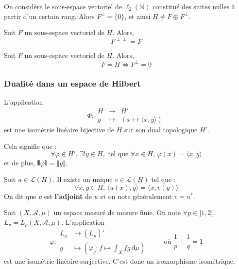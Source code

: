   \begin{cexample}
    On considère le sous-espace vectoriel de $\ell_2(\mathbb{N})$ constitué des suites nulles à partir d'un certain rang. Alors $F^\perp = \{ 0 \}$, et ainsi $H \neq F \oplus F^\perp$.
  \end{cexample}

  \begin{corollary}
    Soit $F$ un sous-espace vectoriel de $H$. Alors,
    \[ F^{\perp \perp} = \overline{F} \]
  \end{corollary}

  \begin{corollary}
    Soit $F$ un sous-espace vectoriel de $H$. Alors,
    \[ \overline{F} = H \iff F^\perp = 0 \]
  \end{corollary}

  \subsubsection{Dualité dans un espace de Hilbert}

  \begin{theorem}
    L'application
    \[
    \Phi :
    \begin{array}{ccc}
      H &\rightarrow& H' \\
      y &\mapsto& (x \mapsto \langle x, y \rangle)
    \end{array}
    \]
    est une isométrie linéaire bijective de $H$ sur son dual topologique $H'$.
  \end{theorem}

  \begin{remark}
    Cela signifie que :
    \[ \forall \varphi \in H', \, \exists! y \in H, \text{ tel que } \forall x \in H, \, \varphi(x) = \langle x, y \rangle \]
    et de plus, $\VERT \varphi \VERT = \Vert y \Vert$.
  \end{remark}

  \begin{application}
    Soit $u \in \mathcal{L}(H)$. Il existe un unique $v \in \mathcal{L}(H)$ tel que :
    \[ \forall x, y \in H, \, \langle u(x), y \rangle = \langle x, v(y) \rangle \]
    On dit que $v$ est \textbf{l'adjoint} de $u$ et on note généralement $v = u^*$.
  \end{application}


  \begin{application}[Dual de $L_p$]
    Soit $(X, \mathcal{A}, \mu)$ un espace mesuré de mesure finie. On note $\forall p \in ]1,2[$, $L_p = L_p(X, \mathcal{A}, \mu)$. L'application
    \[
    \varphi :
    \begin{array}{ll}
      L_q &\rightarrow (L_p)' \\
      g &\mapsto \left( \varphi_g : f \mapsto \int_X f g \, \mathrm{d}\mu \right)
    \end{array}
    \qquad \text{ où } \frac{1}{p} + \frac{1}{q} = 1
    \]
    est une isométrie linéaire surjective. C'est donc un isomorphisme isométrique.
  \end{application}

